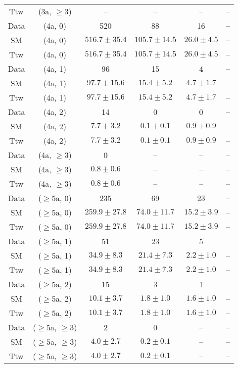 \begin{table}[h!]
{\begin{tabular}{cccccc}
	Ttw & (3a, $\ge3$) & -- & -- & -- & -- \\[0.5ex] 
	Data & (4a, 0) & 520 & 88 & 16 & -- \\[0.5ex] 
	SM & (4a, 0) & $516.7\pm 35.4$ & $105.7\pm 14.5$ & $26.0\pm 4.5$ & -- \\[0.5ex] 
	Ttw & (4a, 0) & $516.7\pm 35.4$ & $105.7\pm 14.5$ & $26.0\pm 4.5$ & -- \\[0.5ex] 
	Data & (4a, 1) & 96 & 15 & 4 & -- \\[0.5ex] 
	SM & (4a, 1) & $97.7\pm 15.6$ & $15.4\pm 5.2$ & $4.7\pm 1.7$ & -- \\[0.5ex] 
	Ttw & (4a, 1) & $97.7\pm 15.6$ & $15.4\pm 5.2$ & $4.7\pm 1.7$ & -- \\[0.5ex] 
	Data & (4a, 2) & 14 & 0 & 0 & -- \\[0.5ex] 
	SM & (4a, 2) & $7.7\pm 3.2$ & $0.1\pm 0.1$ & $0.9\pm 0.9$ & -- \\[0.5ex] 
	Ttw & (4a, 2) & $7.7\pm 3.2$ & $0.1\pm 0.1$ & $0.9\pm 0.9$ & -- \\[0.5ex] 
	Data & (4a, $\ge3$) & 0 & -- & -- & -- \\[0.5ex] 
	SM & (4a, $\ge3$) & $0.8\pm 0.6$ & -- & -- & -- \\[0.5ex] 
	Ttw & (4a, $\ge3$) & $0.8\pm 0.6$ & -- & -- & -- \\[0.5ex] 
	Data & ($\ge5$a, 0) & 235 & 69 & 23 & -- \\[0.5ex] 
	SM & ($\ge5$a, 0) & $259.9\pm 27.8$ & $74.0\pm 11.7$ & $15.2\pm 3.9$ & -- \\[0.5ex] 
	Ttw & ($\ge5$a, 0) & $259.9\pm 27.8$ & $74.0\pm 11.7$ & $15.2\pm 3.9$ & -- \\[0.5ex] 
	Data & ($\ge5$a, 1) & 51 & 23 & 5 & -- \\[0.5ex] 
	SM & ($\ge5$a, 1) & $34.9\pm 8.3$ & $21.4\pm 7.3$ & $2.2\pm 1.0$ & -- \\[0.5ex] 
	Ttw & ($\ge5$a, 1) & $34.9\pm 8.3$ & $21.4\pm 7.3$ & $2.2\pm 1.0$ & -- \\[0.5ex] 
	Data & ($\ge5$a, 2) & 15 & 3 & 1 & -- \\[0.5ex] 
	SM & ($\ge5$a, 2) & $10.1\pm 3.7$ & $1.8\pm 1.0$ & $1.6\pm 1.0$ & -- \\[0.5ex] 
	Ttw & ($\ge5$a, 2) & $10.1\pm 3.7$ & $1.8\pm 1.0$ & $1.6\pm 1.0$ & -- \\[0.5ex] 
	Data & ($\ge5$a, $\ge3$) & 2 & 0 & -- & -- \\[0.5ex] 
	SM & ($\ge5$a, $\ge3$) & $4.0\pm 2.7$ & $0.2\pm 0.1$ & -- & -- \\[0.5ex] 
	Ttw & ($\ge5$a, $\ge3$) & $4.0\pm 2.7$ & $0.2\pm 0.1$ & -- & -- \\[0.5ex] 
	\hline
	\hline
\end{tabular}}
\end{table}
